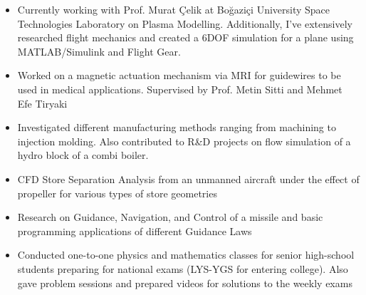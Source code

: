 \documentclass[10pt,a4paper,ragged2e,withhyper]{altacv}
\begin{document}
        
        \begin{itemize}
            \item Currently working with Prof. Murat Çelik at Boğaziçi University Space Technologies Laboratory on Plasma Modelling. Additionally, I've extensively researched flight mechanics and created a 6DOF simulation for a plane using MATLAB/Simulink and Flight Gear. 
        \end{itemize}
        \divider
        
        \begin{itemize}
            \item Worked on a magnetic actuation mechanism via MRI for guidewires to be used in medical applications. Supervised by Prof. Metin Sitti and Mehmet Efe Tiryaki
        \end{itemize}
        \divider
        
        \begin{itemize}
            \item Investigated different manufacturing methods ranging from machining to injection molding. Also contributed to R\&D projects on flow simulation of a hydro block of a combi boiler.
        \end{itemize}
        \divider
        
        \begin{itemize}
            \item CFD Store Separation Analysis from an unmanned aircraft under the effect of propeller for various types of store geometries
            \item Research on Guidance, Navigation, and Control of a missile and basic programming applications of different Guidance Laws
        \end{itemize}
        \divider
        
        \begin{itemize}
            \item Conducted one-to-one physics and mathematics classes for senior high-school students preparing for national exams (LYS-YGS for entering college). Also gave problem sessions and prepared videos for solutions to the weekly exams
        \end{itemize}
\end{document}
